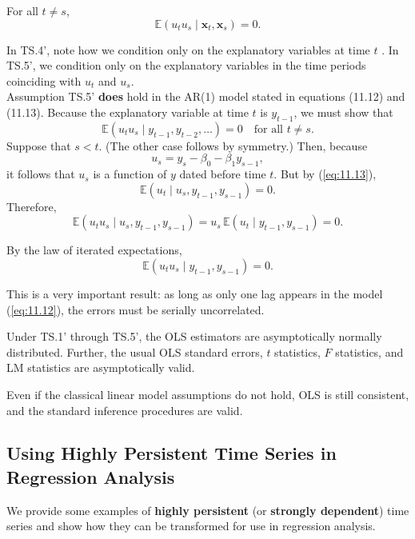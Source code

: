 \documentclass[a4paper, 10pt]{article}
\theoremstyle{definition}	%
\begin{document}
\vspace{0.5cm}

\begin{tcolorbox}[colback=blue!5!white, colframe=blue!80!black, title=Assumption TS.5' -- No Serial Correlation]
For all \( t \ne s \), 
\[
\mathbb{E}(u_t u_s \mid \mathbf{x}_t, \mathbf{x}_s) = 0.
\]
\end{tcolorbox}
In TS.4', note how we condition only on the explanatory variables at time \( t \) . In TS.5', we condition only on the explanatory variables in the time periods coinciding with \( u_t \) and \( u_s \).\\
Assumption TS.5' \textbf{does} hold in the AR(1) model stated in equations (11.12) and (11.13). Because the explanatory variable at time \( t \) is \( y_{t-1} \), we must show that
\[
\mathbb{E}(u_t u_s \mid y_{t-1}, y_{t-2}, \ldots ) = 0 \quad \text{for all } t \ne s.
\]
Suppose that \( s < t \). (The other case follows by symmetry.)
Then, because
\[
u_s = y_s - \beta_0 - \beta_1 y_{s-1},
\]
it follows that \( u_s \) is a function of \( y \) dated before time \( t \). But by (\ref{eq:11.13}),
\[
\mathbb{E}(u_t \mid u_s, y_{t-1}, y_{s-1}) = 0.
\]
Therefore,
\[
\mathbb{E}(u_t u_s \mid u_s, y_{t-1}, y_{s-1}) = u_s \, \mathbb{E}(u_t \mid y_{t-1}, y_{s-1}) = 0.
\]

By the law of iterated expectations,
\[
\mathbb{E}(u_t u_s \mid y_{t-1}, y_{s-1}) = 0.
\]

This is a very important result: as long as only one lag appears in the model (\ref{eq:11.12}), the errors must be serially uncorrelated.
\begin{tcolorbox}[colback=blue!5!white, colframe=blue!80!black, title=Theorem 11.2 -- Asymptotic Normality of OLS]
Under TS.1' through TS.5', the OLS estimators are asymptotically normally distributed. Further, the usual OLS standard errors, \( t \) statistics, \( F \) statistics, and LM statistics are asymptotically valid.
\end{tcolorbox}
Even if the classical linear model assumptions do not hold, OLS is still consistent, and the standard inference procedures are valid.

\subsection{Using Highly Persistent Time Series in Regression Analysis}
We provide some examples of \textbf{highly persistent} (or \textbf{strongly dependent}) time series and show how they can be transformed for use in regression analysis.
\end{document}
